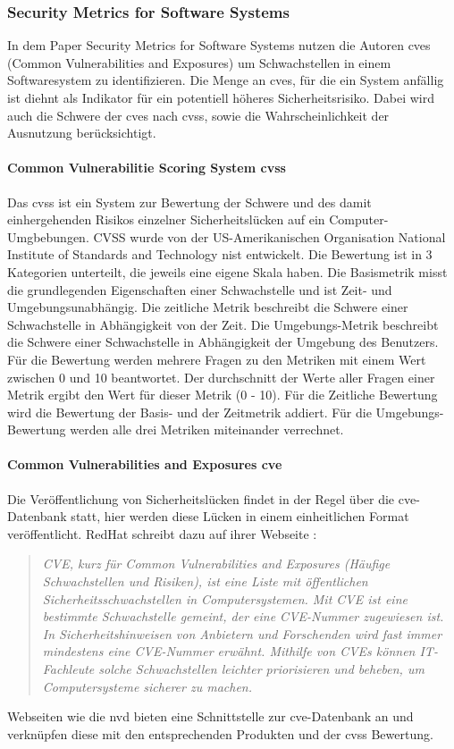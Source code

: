 \documentclass[12pt, a4paper, ngerman]{article}
\begin{document}
\subsubsection{Security Metrics for Software Systems~\cite{Wang_Wang_Guo_Xia_2009}}

In dem Paper Security Metrics for Software Systems nutzen die Autoren \ac{cve}s (Common Vulnerabilities and Exposures) 
um Schwachstellen in einem Softwaresystem zu identifizieren. 
Die Menge an \ac{cve}s, für die ein System anfällig ist diehnt als Indikator für ein potentiell höheres Sicherheitsrisiko.
Dabei wird auch die Schwere der \ac{cve}s nach \ac{cvss}, sowie die Wahrscheinlichkeit der Ausnutzung berücksichtigt.

\paragraph{Common Vulnerabilitie Scoring System \ac{cvss}}

Das \ac{cvss} ist ein System zur Bewertung der Schwere und 
des damit einhergehenden Risikos einzelner Sicherheitslücken auf ein Computer-Umgbebungen.
CVSS wurde von der US-Amerikanischen Organisation National Institute of Standards and Technology \ac{nist} entwickelt. 
Die Bewertung ist in  3 Kategorien unterteilt, die jeweils eine eigene Skala haben.
Die Basismetrik misst die grundlegenden Eigenschaften einer Schwachstelle und ist Zeit- und Umgebungsunabhängig.
Die zeitliche Metrik beschreibt die Schwere einer Schwachstelle in Abhängigkeit von der Zeit.
Die Umgebungs-Metrik beschreibt die Schwere einer Schwachstelle in Abhängigkeit der Umgebung des Benutzers.
Für die Bewertung werden mehrere Fragen zu den Metriken mit einem Wert zwischen 0 und 10 beantwortet.
Der durchschnitt der Werte aller Fragen einer Metrik ergibt den Wert für dieser Metrik (0 - 10).
Für die Zeitliche Bewertung wird die Bewertung der Basis- und der Zeitmetrik addiert.
Für die Umgebungs-Bewertung werden alle drei Metriken miteinander verrechnet.

\paragraph{Common Vulnerabilities and Exposures \ac{cve}}

Die Veröffentlichung von Sicherheitslücken findet in der Regel über die \ac{cve}-Datenbank statt, 
hier werden diese Lücken in einem einheitlichen Format veröffentlicht.
RedHat schreibt dazu auf ihrer Webseite \cite{Redhat_CVE}: 
\begin{quote}
  \textit{
    CVE, kurz für Common Vulnerabilities and Exposures (Häufige Schwachstellen und Risiken), ist eine Liste mit öffentlichen Sicherheitsschwachstellen in Computersystemen. Mit CVE ist eine bestimmte Schwachstelle gemeint, der eine CVE-Nummer zugewiesen ist.
    In Sicherheitshinweisen von Anbietern und Forschenden wird fast immer mindestens eine CVE-Nummer erwähnt. Mithilfe von CVEs können IT-Fachleute solche Schwachstellen leichter priorisieren und beheben, um Computersysteme sicherer zu machen.
  } 
\end{quote}
Webseiten wie die \ac{nvd} bieten eine Schnittstelle zur \ac{cve}-Datenbank an und 
verknüpfen diese mit den entsprechenden Produkten und der \ac{cvss} Bewertung.
\end{document}

